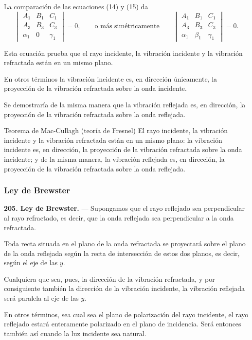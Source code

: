 La comparación de las ecuaciones (14) y (15) da
\[
\begin{vmatrix}A_1&B_1&C_1\\A_3&B_3&C_3\\\alpha_1&0&\gamma_1\end{vmatrix}=0,
\qquad\text{o más simétricamente}\qquad
\begin{vmatrix}A_1&B_1&C_1\\A_3&B_3&C_3\\\alpha_1&\beta_1&\gamma_1\end{vmatrix}=0.
\]

Esta ecuación prueba que el rayo incidente, la vibración incidente y la
vibración refractada están en un mismo plano.

En otros términos la vibración incidente es, en dirección únicamente, la
proyección de la vibración refractada sobre la onda incidente.

Se demostraría de la misma manera que la vibración reflejada es, en
dirección, la proyección de la vibración refractada sobre la onda
reflejada.

\begin{enunciado}{Teorema de Mac-Cullagh (teoría de Fresnel)}
El rayo incidente, la vibración incidente y la vibración refractada están
en un mismo plano: la vibración incidente es, en dirección, la proyección
de la vibración refractada sobre la onda incidente; y de la misma manera,
la vibración reflejada es, en dirección, la proyección de la vibración
refractada sobre la onda reflejada.
\end{enunciado}

\subsubsection{Ley de Brewster}

\noindent\textbf{205. Ley de Brewster.} — Supongamos que el rayo reflejado
sea perpendicular al rayo refractado, es decir, que la onda reflejada sea
perpendicular a la onda refractada.

Toda recta situada en el plano de la onda refractada se proyectará sobre
el plano de la onda reflejada según la recta de intersección de estos dos
planos, es decir, según el eje de las $y$.

Cualquiera que sea, pues, la dirección de la vibración refractada, y por
consiguiente también la dirección de la vibración incidente, la vibración
reflejada será paralela al eje de las $y$.

En otros términos, sea cual sea el plano de polarización del rayo
incidente, el rayo reflejado estará enteramente polarizado en el plano de
incidencia. Será entonces también así cuando la luz incidente sea
natural.

